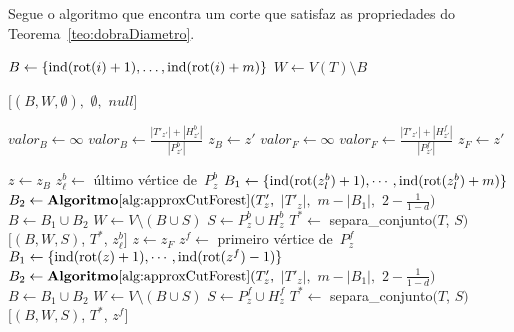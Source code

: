 		Segue o algoritmo que encontra um corte que satisfaz as propriedades do
		Teorema~\ref{teo:dobraDiametro}.

		\bigskip

	\begin{algorithm}[H]
	\label{alg:dobraDiametro}

		\caption{}
		{
			{
				$B\gets \{\mathrm{ind}(\mathrm{rot}(i)+1),\ldots, \mathrm{ind}(\mathrm{rot}(i)+m)\}$\;
				$W\gets V(T)\setminus B$\;

				\Return $[(B,W,\emptyset),$ $\emptyset,$ $null]$\;
			}
		}
		$valor_B \gets \infty$\;
		{
			{
			 	$valor_B \gets \frac{|T'_{z'}|+|H_{z'}^b|}{|P^b_{z'}|}$\;
			 	$z_B \gets z'$\; 
			}
		}
		$valor_F \gets \infty$\;
		{
			{
			 	$valor_F \gets \frac{|T'_{z'}|+|H_{z'}^f|}{|P^f_{z'}|}$\;
			 	$z_F \gets z'$\; 
			}
		}
	\end{algorithm}	

	\LinesNumberedHidden
	\begin{algorithm}[H]
	\Numberline
		{
			\Numberline$z\gets z_B$\;
			\Numberline$z^b_\ell \gets $ último vértice de~$P_z^b$\;
			\Numberline$B_1 \gets \{\mathrm{ind}(\mathrm{rot}(z^b_l)+1),\cdots, \mathrm{ind}(\mathrm{rot}(z^b_l)+m)\}$\;
			\Numberline$B_2 \gets \mathbf {Algoritmo\ref{alg:approxCutForest}}(T'_z,$ $|T'_z|,$ $m-|B_1|,$ $2-\frac{1}{1-d})$\;
			\Numberline$B \gets B_1\cup B_2$\;
			\Numberline$W \gets V\setminus (B\cup S)$\; 
			\Numberline$S \gets P_z^b\cup H^b_z $\;
			\Numberline$T^*\gets $ {\sc separa\_conjunto}$(T$, $S)$\;
			\Numberline\Return $[(B,W,S)$, $T^*$, $z^b_\ell]$\;
		}
		\Numberline
		\Else
		{
			\Numberline$z\gets z_F$\;
			\Numberline$z^f \gets $ primeiro vértice de~$P_z^f$\;
			\Numberline$B_1 \gets \{\mathrm{ind}(\mathrm{rot}(z)+1),\cdots, \mathrm{ind}(\mathrm{rot}(z^f)-1)\}$\;
			\Numberline$B_2 \gets \mathbf {Algoritmo\ref{alg:approxCutForest}}(T'_z,$ $|T'_z|,$ $m-|B_1|,$ $2-\frac{1}{1-d})$\;
			\Numberline$B \gets B_1\cup B_2$\;
			\Numberline$W \gets V\setminus (B\cup S)$\; 
			\Numberline$S \gets P_z^f\cup H^f_z $\;
			\Numberline$T^*\gets $ {\sc separa\_conjunto}$(T$, $S)$\;
			\Numberline\Return $[(B,W,S)$, $T^*$, $z^f]$\;		
		}
	\end{algorithm}	
	\LinesNumbered
	\bigskip
	\bigskip
